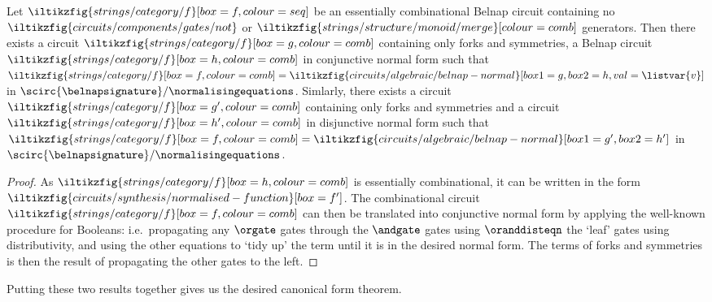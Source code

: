 \begin{proposition}\label{prop:normal-form}
    Let \(
    \iltikzfig{strings/category/f}[box=f,colour=seq]
    \) be an essentially combinational Belnap circuit containing no \(
    \iltikzfig{circuits/components/gates/not}
    \) or \(
    \iltikzfig{strings/structure/monoid/merge}[colour=comb]
    \) generators.
    Then there exists a circuit \(
    \iltikzfig{strings/category/f}[box=g,colour=comb]
    \) containing only forks and symmetries, a Belnap circuit \(
    \iltikzfig{strings/category/f}[box=h,colour=comb]
    \) in conjunctive normal form such that \(
    \iltikzfig{strings/category/f}[box=f,colour=comb]
    =
    \iltikzfig{circuits/algebraic/belnap-normal}[box1=g,box2=h,val=\listvar{v}]
    \) in \(
    \scirc{\belnapsignature} / \normalisingequations
    \).
    Simlarly, there exists a circuit \(
    \iltikzfig{strings/category/f}[box=g^\prime,colour=comb]
    \) containing only forks and symmetries and a circuit \(
    \iltikzfig{strings/category/f}[box=h^\prime,colour=comb]
    \) in disjunctive normal form such that \(
    \iltikzfig{strings/category/f}[box=f,colour=comb]
    =
    \iltikzfig{circuits/algebraic/belnap-normal}[box1=g^\prime,box2=h^\prime]
    \) in \(
    \scirc{\belnapsignature} / \normalisingequations
    \).
\end{proposition}
\begin{proof}
    As \(
    \iltikzfig{strings/category/f}[box=h,colour=comb]
    \) is essentially combinational, it can be written in the form \(
    \iltikzfig{circuits/synthesis/normalised-function}[box=f^\prime]
    \).
    The combinational circuit \(
    \iltikzfig{strings/category/f}[box=f,colour=comb]
    \) can then be translated into conjunctive normal form by applying the
    well-known procedure for Booleans: i.e.\ propagating any \(\orgate\) gates
    through the \(\andgate\) gates using \(\oranddisteqn\)
    the `leaf' gates using distributivity, and using the other equations to `tidy up' the
    term until it is in the desired normal form.
    The terms of forks and symmetries is then the result of propagating the
    other gates to the left.
\end{proof}

Putting these two results together gives us the desired canonical form theorem.

